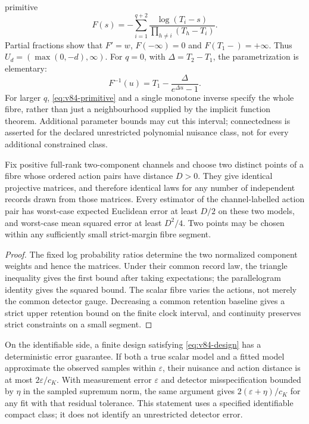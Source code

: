 primitive
\begin{equation}\label{eq:v84-primitive}
 F(s)=-\sum_{i=1}^{q+2}
 \frac{\log(T_i-s)}{\prod_{h\ne i}(T_h-T_i)}.
\end{equation}
Partial fractions show that $F'=w$, $F(-\infty)=0$ and
$F(T_1-)=+\infty$. Thus $U_d=(\max(0,-d),\infty)$.
For $q=0$, with $\Delta=T_2-T_1$, the parametrization is elementary:
\[
 F^{-1}(u)=T_1-\frac{\Delta}{e^{\Delta u}-1}.
\]
For larger $q$, \eqref{eq:v84-primitive} and a single monotone inverse
specify the whole fibre, rather than just a neighbourhood supplied by
the implicit function theorem. Additional parameter bounds may cut
this interval; connectedness is asserted for the declared unrestricted
polynomial nuisance class, not for every additional constrained class.

\begin{corollary}
\label{cor:v84-fibre-risk}
Fix positive full-rank two-component channels and choose two distinct
points of a fibre whose ordered action pairs have distance $D>0$.
They give identical projective matrices, and therefore identical laws
for any number of independent records drawn from those matrices.
Every estimator of the channel-labelled action pair has worst-case
expected Euclidean error at least $D/2$ on these two models, and
worst-case mean squared error at least $D^2/4$. Two points may be
chosen within any sufficiently small strict-margin fibre segment.
\end{corollary}
\begin{proof}
The fixed log probability ratios determine the two normalized component
weights and hence the matrices. Under their common record law, the
triangle inequality gives the first bound after taking expectations;
the parallelogram identity gives the squared bound. The scalar fibre
varies the actions, not merely the common detector gauge. Decreasing
a common retention baseline gives a strict upper retention bound on
the finite clock interval, and continuity preserves strict constraints
on a small segment.
\end{proof}
On the identifiable side, a finite design satisfying
\eqref{eq:v84-design} has a deterministic error guarantee. If both a
true scalar model and a fitted model approximate the observed samples
within $\varepsilon$, their nuisance and action distance is at most
$2\varepsilon/c_K$. With measurement error $\varepsilon$ and detector
misspecification bounded by $\eta$ in the sampled supremum norm, the
same argument gives $2(\varepsilon+\eta)/c_K$ for any fit with that
residual tolerance. This statement uses a specified identifiable
compact class; it does not identify an unrestricted detector error.

